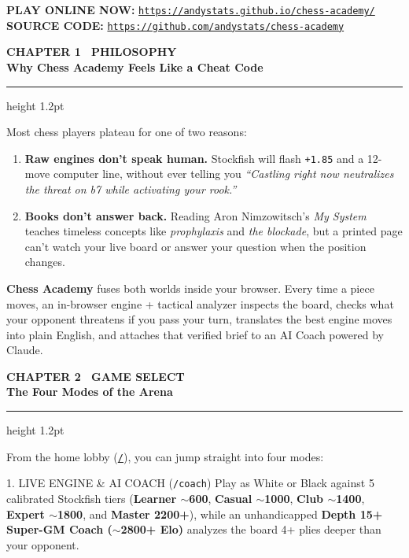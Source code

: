 \documentclass[10pt,twoside]{article}
\newcommand{\manualsection}[2]{%
  \vspace{2pt}
  {\noindent\sffamily\bfseries\scriptsize\textcolor{brand}{#1}}\\[3pt]
  {\noindent\Large\bfseries\textcolor{ink}{#2}}\\[3pt]
  {\color{ink}\hrule height 1.2pt}
  \vspace{4pt}
}
\begin{document}
\vfill
\begin{center}
  \footnotesize\sffamily
  \textbf{PLAY ONLINE NOW:} \href{https://andystats.github.io/chess-academy/}{\texttt{https://andystats.github.io/chess-academy/}}\\[2pt]
  \textbf{SOURCE CODE:} \href{https://github.com/andystats/chess-academy}{\texttt{https://github.com/andystats/chess-academy}}
\end{center}
\vspace*{4pt}
\newpage

\manualsection{CHAPTER 1 \textbar\ PHILOSOPHY}{Why Chess Academy Feels Like a Cheat Code}

Most chess players plateau for one of two reasons:
\begin{enumerate}[leftmargin=16pt, itemsep=2pt, topsep=1pt]
  \item \textbf{Raw engines don't speak human.} Stockfish will flash \texttt{+1.85} and a 12-move computer line, without ever telling you \emph{``Castling right now neutralizes the threat on b7 while activating your rook.''}
  \item \textbf{Books don't answer back.} Reading Aron Nimzowitsch's \emph{My System} teaches timeless concepts like \emph{prophylaxis} and \emph{the blockade}, but a printed page can't watch your live board or answer your question when the position changes.
\end{enumerate}

\textbf{Chess Academy} fuses both worlds inside your browser. Every time a piece moves, an in-browser engine + tactical analyzer inspects the board, checks what your opponent threatens if you pass your turn, translates the best engine moves into plain English, and attaches that verified brief to an AI Coach powered by Claude.

\vspace{2pt}
\manualsection{CHAPTER 2 \textbar\ GAME SELECT}{The Four Modes of the Arena}

From the home lobby (\href{https://andystats.github.io/chess-academy/}{\texttt{/}}), you can jump straight into four modes:

\begin{manualbox}{1. LIVE ENGINE \& AI COACH (\texttt{/coach})}
\footnotesize
Play as White or Black against 5 calibrated Stockfish tiers (\textbf{Learner $\sim$600}, \textbf{Casual $\sim$1000}, \textbf{Club $\sim$1400}, \textbf{Expert $\sim$1800}, and \textbf{Master 2200+}), while an unhandicapped \textbf{Depth 15+ Super-GM Coach ($\sim$2800+ Elo)} analyzes the board 4+ plies deeper than your opponent.
\end{manualbox}
\end{document}
